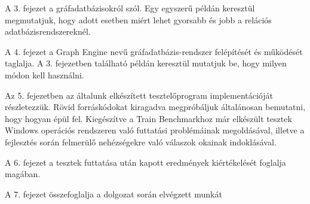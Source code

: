 A 3. fejezet a gráfadatbázisokról szól. Egy egyszerű példán keresztül megmutatjuk, hogy adott esetben miért lehet gyorsabb és jobb a relációs adatbázisrendszereknél.

A 4. fejezet a Graph Engine nevű gráfadatbázis-rendszer felépítését és működését taglalja. A 3. fejezetben található példán keresztül mutatjuk be, hogy milyen módon kell használni.

Az 5. fejezetben az általunk elkészített tesztelőprogram implementációját részletezzük. Rövid forráskódokat kiragadva megpróbáljuk általánosan bemutatni, hogy hogyan épül fel. Kiegészítve a Train Benchmarkhoz már elkészült tesztek Windows operációs rendszeren való futtatási problémáinak megoldásával, illetve a fejlesztés során felmerülő nehézségekre való válaszok okainak indoklásával.


A 6. fejezet a tesztek futtatása után kapott eredmények kiértékelését foglalja magában.

A 7. fejezet összefoglalja a dolgozat során elvégzett munkát